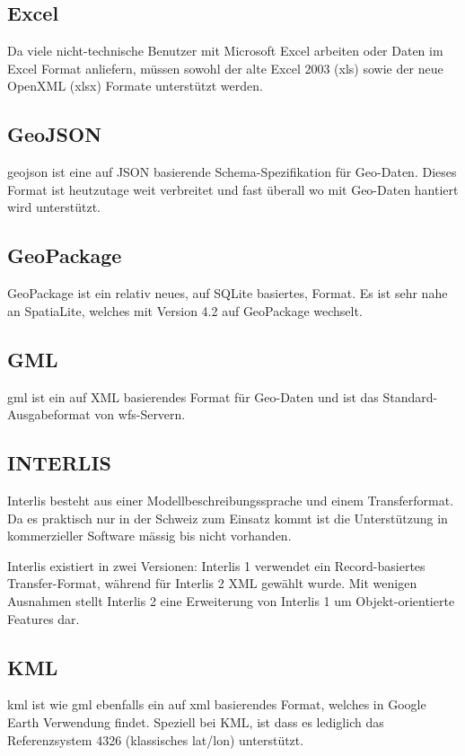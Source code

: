 \subsection{Excel}
Da viele nicht-technische Benutzer mit Microsoft Excel arbeiten\cite{sfkeller} oder Daten im Excel Format anliefern, müssen sowohl der alte Excel 2003 (xls) sowie der neue OpenXML (xlsx) Formate unterstützt werden.

\subsection{GeoJSON}
\gls{geojson} ist eine auf JSON basierende Schema-Spezifikation für Geo-Daten. Dieses Format ist heutzutage weit verbreitet und fast überall wo mit Geo-Daten hantiert wird unterstützt.

\subsection{GeoPackage}
GeoPackage ist ein relativ neues, auf SQLite basiertes, Format. Es ist sehr nahe an SpatiaLite, welches mit Version 4.2 auf GeoPackage wechselt.

\subsection{GML}
\gls{gml} ist ein auf XML basierendes Format für Geo-Daten und ist das Standard-Ausgabeformat von \acs{wfs}-Servern.


\subsection{INTERLIS}
Interlis besteht aus einer Modellbeschreibungssprache und einem Transferformat. Da es praktisch nur in der Schweiz zum Einsatz kommt ist die Unterstützung in kommerzieller Software mässig bis nicht vorhanden.

Interlis existiert in zwei Versionen: Interlis 1 verwendet ein Record-basiertes Transfer-Format, während für Interlis 2 XML gewählt wurde. Mit wenigen Ausnahmen stellt Interlis 2 eine Erweiterung von Interlis 1 um Objekt-orientierte Features dar.

\subsection{KML}
\gls{kml} ist wie \gls{gml} ebenfalls ein auf \gls{xml} basierendes Format, welches in Google Earth Verwendung findet. Speziell bei KML, ist dass es lediglich das Referenzsystem 4326 (klassisches lat/lon) unterstützt.


